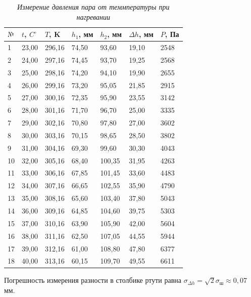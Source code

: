 \documentclass[a4paper,12pt]{article}
\begin{document}
\begin{table}[!ht]
    \centering
    \begin{tabular}{|l|l|l|l|l|l|l|}
    \hline
        $№$ & $t$, $C^\circ$ & $T$, K & $h_1$, мм & $h_2$, мм & $\Delta h$, мм & $P$, Па \\ \hline
        1 & 23,00 & 296,16 & 74,50 & 93,60 & 19,10 & 2548 \\ \hline
        2 & 24,00 & 297,16 & 74,45 & 93,70 & 19,25 & 2568 \\ \hline
        3 & 25,00 & 298,16 & 74,20 & 94,10 & 19,90 & 2655 \\ \hline
        4 & 26,00 & 299,16 & 73,20 & 95,05 & 21,85 & 2915 \\ \hline
        5 & 27,00 & 300,16 & 72,35 & 95,90 & 23,55 & 3142 \\ \hline
        6 & 28,00 & 301,16 & 71,70 & 96,70 & 25,00 & 3335 \\ \hline
        7 & 29,00 & 302,16 & 70,80 & 97,80 & 27,00 & 3602 \\ \hline
        8 & 30,00 & 303,16 & 70,15 & 98,65 & 28,50 & 3802 \\ \hline
        9 & 31,00 & 304,16 & 69,30 & 99,60 & 30,30 & 4043 \\ \hline
        10 & 32,00 & 305,16 & 68,40 & 100,35 & 31,95 & 4263 \\ \hline
        11 & 33,00 & 306,16 & 67,85 & 101,45 & 33,60 & 4483 \\ \hline
        12 & 34,00 & 307,16 & 66,65 & 102,55 & 35,90 & 4790 \\ \hline
        13 & 35,00 & 308,16 & 65,60 & 103,40 & 37,80 & 5043 \\ \hline
        14 & 36,00 & 309,16 & 64,85 & 104,60 & 39,75 & 5303 \\ \hline
        15 & 37,00 & 310,16 & 63,90 & 105,90 & 42,00 & 5604 \\ \hline
        16 & 38,00 & 311,16 & 62,50 & 107,05 & 44,55 & 5944 \\ \hline
        17 & 39,00 & 312,16 & 61,00 & 108,80 & 47,80 & 6377 \\ \hline
        18 & 40,00 & 313,16 & 60,15 & 109,70 & 49,55 & 6611 \\ \hline
    \end{tabular}\caption{\textit{Измерение давления пара от теммпературы при нагревании}}\label{data-1}
\end{table}


Погрешность измерения разности в столбике ртути равна $\sigma_{\Delta h} = \sqrt{2}\sigma_\text{ш} \approx 0,07$ мм.
\end{document}
